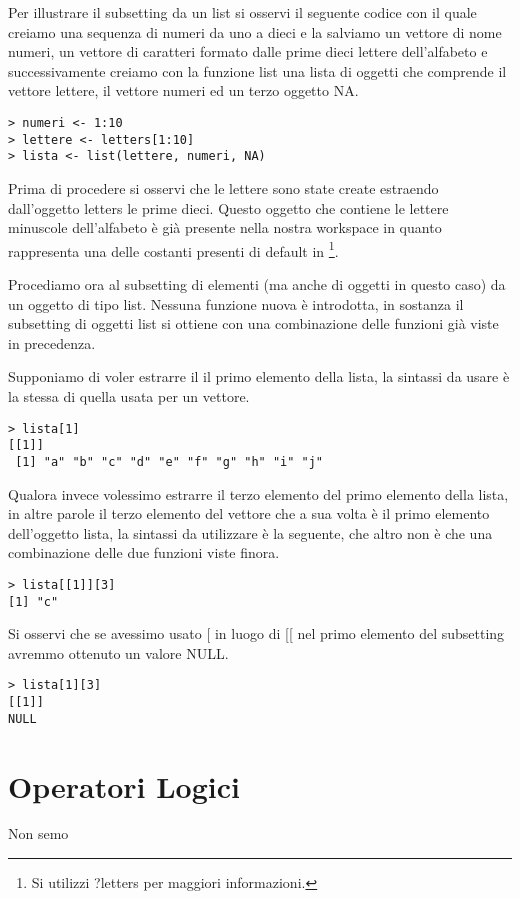 Per illustrare il subsetting da un list si osservi il seguente codice con il quale creiamo una sequenza di numeri da uno a dieci e la salviamo un vettore di nome \textsf{numeri}, un vettore di caratteri formato dalle prime dieci lettere dell'alfabeto e successivamente creiamo con la funzione \textsf{list} una lista di oggetti che comprende il vettore lettere, il vettore numeri ed un terzo oggetto NA.

\begin{lstlisting}
> numeri <- 1:10
> lettere <- letters[1:10]
> lista <- list(lettere, numeri, NA)
\end{lstlisting}

Prima di procedere si osservi che le lettere sono state create estraendo dall'oggetto \textsf{letters} le prime dieci. Questo oggetto che contiene le lettere minuscole dell'alfabeto è già presente nella nostra workspace in quanto rappresenta una delle costanti presenti di default in \erre\footnote{Si utilizzi ?letters per maggiori informazioni.}.

Procediamo ora al subsetting di elementi (ma anche di oggetti in questo caso) da un oggetto di tipo list. Nessuna funzione nuova è introdotta, in sostanza il subsetting di oggetti list si ottiene con una combinazione delle funzioni già viste in precedenza.

Supponiamo di voler estrarre il il primo elemento della lista, la sintassi da usare è la stessa di quella usata per un vettore.
\begin{lstlisting}
> lista[1]
[[1]]
 [1] "a" "b" "c" "d" "e" "f" "g" "h" "i" "j"
\end{lstlisting}
 
Qualora invece volessimo estrarre il terzo elemento del primo elemento della lista, in altre parole il terzo elemento del vettore che a sua volta è il primo elemento dell'oggetto lista, la sintassi da utilizzare è la seguente, che altro non è che una combinazione delle due funzioni viste finora.
\begin{lstlisting}
> lista[[1]][3]
[1] "c"
\end{lstlisting}

Si osservi che se avessimo usato \textsf{[} in luogo di \textsf{[[} nel primo elemento del subsetting avremmo ottenuto un valore NULL.
\begin{lstlisting}
> lista[1][3]
[[1]]
NULL
\end{lstlisting}
\section{Operatori Logici}
Non semo


